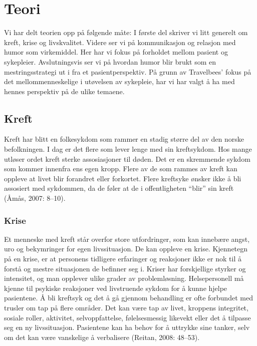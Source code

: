 \chapter{Teori}

Vi har delt teorien opp på følgende måte: I første del skriver vi litt generelt
om kreft, krise og livskvalitet. Videre ser vi på kommunikasjon og relasjon med
humor som virkemiddel. Her har vi fokus på forholdet mellom pasient og
sykepleier. Avslutningsvis ser vi på hvordan humor blir brukt som en
mestringsstrategi ut i fra et pasientperspektiv. På grunn av Travelbees’ fokus
på det mellommenneskelige i utøvelsen av sykepleie, har vi har valgt å ha med
hennes perspektiv på de ulike temaene.

\section{Kreft}

Kreft har blitt en folkesykdom som rammer en stadig større del av den norske
befolkningen.  I dag er det flere som lever lenge med sin kreftsykdom. Hos
mange utløser ordet kreft sterke assosiasjoner til døden. Det er en skremmende
sykdom som kommer innenfra ens egen kropp. Flere av de som rammes av kreft kan
oppleve at livet blir forandret eller forkortet. Flere kreftsyke ønsker ikke å
bli assosiert med sykdommen, da de føler at de i offentligheten “blir” sin
kreft (Åmås, 2007: 8--10).

\subsection{Krise}

Et menneske med kreft står overfor store utfordringer, som kan innebære angst,
uro og bekymringer for egen livssituasjon. De kan oppleve en krise. Kjennetegn
på en krise, er at personens tidligere erfaringer og reaksjoner ikke er nok til
å forstå og mestre situasjonen de befinner seg i. Kriser har forskjellige
styrker og intensitet, og man opplever ulike grader av problemløsning.
Helsepersonell må kjenne til psykiske reaksjoner ved livstruende sykdom for å
kunne hjelpe pasientene. Å bli kreftsyk og det å gå gjennom behandling er ofte
forbundet med trusler om tap på flere områder. Det kan være tap av livet,
kroppens integritet, sosiale roller, aktivitet, selvoppfattelse, følelsesmessig
likevekt eller det å tilpasse seg en ny livssituasjon. Pasientene kan ha behov
for å uttrykke sine tanker, selv om det kan være vanskelige å verbalisere
(Reitan, 2008: 48--53).

